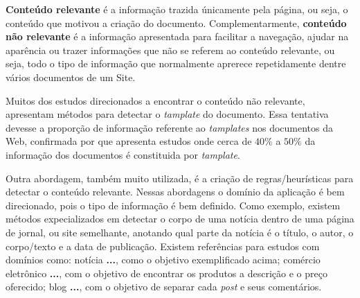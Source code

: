 \documentclass{acm_proc_article-sp}
\newcommand{\remove}[1]{}
\numberwithin{equation}{section}
\begin{document}
{\bf Conteúdo relevante} é a informação trazida únicamente pela página,
		ou seja, 
		o conteúdo que motivou a criação do documento. 
	Complementarmente,
	{\bf conteúdo não relevante} é a informação apresentada para facilitar a 
	navegação, ajudar na aparência ou trazer informações que não se 
	referem ao conteúdo relevante,
		ou seja, 
		todo o tipo de informação que normalmente aprerece repetidamente 
		dentre vários documentos de um Site.

Muitos dos estudos direcionados a encontrar o conteúdo não relevante,
apresentam métodos para detectar o {\it tamplate} do documento.
	Essa tentativa devesse a proporção de informação referente ao 
	{\it tamplates} nos documentos da Web, confirmada por \cite{Gibson2005}
	que apresenta estudos onde cerca de $40\%$ a $50\%$ da
	informação dos documentos é constituida por {\it tamplate}.

Outra abordagem, também muito utilizada, é a criação de regras/heurísticas para
detectar o conteúdo relevante.
	Nessas abordagens
		o domínio da aplicação é bem direcionado, pois o tipo de informação é 
		bem definido.
		Como exemplo,
			existem métodos expecializados em detectar o corpo de uma notícia 
			dentro de uma página de jornal, ou site semelhante,
			anotando qual parte da notícia é 
				o título,
				o autor, o corpo/texto e
				a data de publicação.
			Existem referências para estudos com domínios como:
				notícia {\bf \cite{}...}, como o objetivo exemplificado acima;
				comércio eletrônico {\bf \cite{}...}, com o objetivo de 
				encontrar os produtos a descrição e o preço oferecido;
				blog {\bf \cite{}...}, com o objetivo de separar cada 
				{\it post} e seus comentários.


\remove{
Embora estudos como \cite{}... apresentem resutados "interessantes" na detecção de templates, 
}






\end{document}

